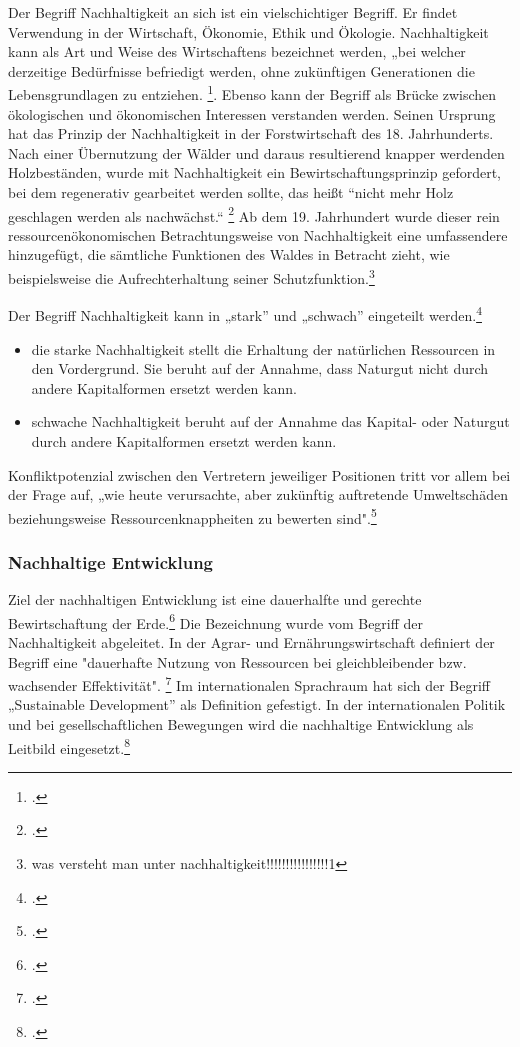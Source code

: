 \documentclass{scrartcl}
\begin{document}
Der Begriff Nachhaltigkeit an sich ist ein vielschichtiger Begriff. Er findet Verwendung in der Wirtschaft, Ökonomie, Ethik und Ökologie. Nachhaltigkeit kann als Art und Weise des Wirtschaftens bezeichnet werden, „bei welcher derzeitige Bedürfnisse befriedigt werden, ohne zukünftigen Generationen die Lebensgrundlagen zu entziehen. \footcite{DefinitionWirtschaftslexikonb}. Ebenso kann der Begriff als Brücke zwischen ökologischen und ökonomischen Interessen verstanden werden. Seinen Ursprung hat das Prinzip der Nachhaltigkeit in der Forstwirtschaft des 18. Jahrhunderts. Nach einer Übernutzung der Wälder und daraus resultierend knapper werdenden Holzbeständen, wurde mit Nachhaltigkeit ein Bewirtschaftungsprinzip gefordert, bei dem regenerativ gearbeitet werden sollte, das heißt “nicht mehr Holz geschlagen werden als nachwächst.“ \footcite{NachhaltigeBrockhaus.de}
Ab dem 19. Jahrhundert wurde dieser rein ressourcenökonomischen Betrachtungsweise von Nachhaltigkeit eine umfassendere hinzugefügt, die sämtliche Funktionen des Waldes in Betracht zieht, wie beispielsweise die Aufrechterhaltung seiner Schutzfunktion.\footnote{was versteht man unter nachhaltigkeit!!!!!!!!!!!!!!!!1}

\hfill \break
Der Begriff Nachhaltigkeit kann in „stark” und „schwach” eingeteilt werden.\footcite{Nachhaltigkeit}


\begin{itemize}
\item die starke Nachhaltigkeit stellt die Erhaltung der natürlichen Ressourcen in den Vordergrund. Sie beruht auf der Annahme, dass Naturgut nicht durch andere Kapitalformen ersetzt werden kann.
\item schwache Nachhaltigkeit beruht auf der Annahme das Kapital- oder Naturgut durch andere Kapitalformen ersetzt werden kann.
\end{itemize}
Konfliktpotenzial zwischen den Vertretern jeweiliger Positionen tritt vor allem bei der Frage auf, „wie heute verursachte, aber zukünftig auftretende Umweltschäden beziehungsweise Ressourcenknappheiten zu bewerten sind".\footcite{NachhaltigeBrockhaus.de}



\subsubsection{Nachhaltige Entwicklung}
  Ziel der nachhaltigen Entwicklung ist eine dauerhalfte und gerechte Bewirtschaftung der Erde.\footcite{NachhaltigeBrockhaus.de} Die Bezeichnung wurde vom Begriff der Nachhaltigkeit abgeleitet. In der Agrar- und Ernährungswirtschaft definiert der Begriff eine "dauerhafte Nutzung von Ressourcen bei gleichbleibender bzw. wachsender Effektivität". \footcite{oppenhauser2010nachhaltigkeit} Im internationalen Sprachraum hat sich der Begriff „Sustainable Development” als Definition gefestigt. In der internationalen Politik und bei gesellschaftlichen Bewegungen wird die nachhaltige Entwicklung als Leitbild eingesetzt.\footcite{oppenhauser2010nachhaltigkeit}
 
\end{document}
